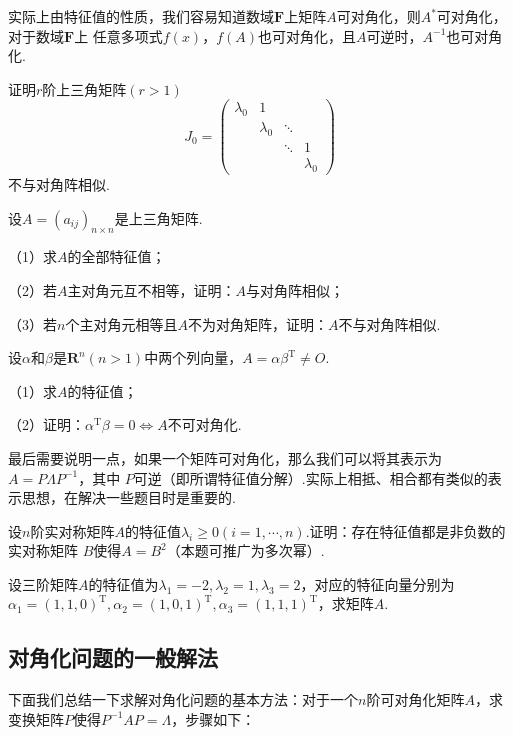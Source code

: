 实际上由特征值的性质，我们容易知道数域$\mathbf{F}$上矩阵$A$可对角化，则$A^*$可对角化，对于数域$\mathbf{F}$上
任意多项式$f(x)$，$f(A)$也可对角化，且$A$可逆时，$A^{-1}$也可对角化.
\begin{example}
	证明$r$阶上三角矩阵$(r>1)$
	$$J_0=\begin{pmatrix}
		\lambda_0 & 1 &  &  \\ 
		  & \lambda_0 & \ddots &  \\
		  &  & \ddots &  1 \\
		  &  &  &  \lambda_0
	\end{pmatrix}$$
	不与对角阵相似.
\end{example}
\begin{example}
	设$A=(a_{ij})_{n\times n}$是上三角矩阵.
	
	\textup{（1）}求$A$的全部特征值\textup{；}

	\textup{（2）}若$A$主对角元互不相等，证明：$A$与对角阵相似\textup{；}

	\textup{（3）}若$n$个主对角元相等且$A$不为对角矩阵，证明：$A$不与对角阵相似.
\end{example}
\begin{example}
	设$\alpha$和$\beta$是$\mathbf{R}^n(n>1)$中两个列向量，$A=\alpha\beta^\mathrm{T}\neq O$.
	
	\textup{（1）}求$A$的特征值\textup{；}
	
	\textup{（2）}证明：$\alpha^\mathrm{T}\beta=0\iff A$不可对角化.
\end{example}
最后需要说明一点，如果一个矩阵可对角化，那么我们可以将其表示为$A=P\Lambda P^{-1}$，其中
$P$可逆（即所谓特征值分解）.实际上相抵、相合都有类似的表示思想，在解决一些题目时是重要的.
\begin{example}
	设$n$阶实对称矩阵$A$的特征值$\lambda_i\ge 0(i=1,\cdots,n)$.证明：存在特征值都是非负数的实对称矩阵
	$B$使得$A=B^2$（本题可推广为多次幂）.
\end{example}
\begin{example}
	设三阶矩阵$A$的特征值为$\lambda_1=-2,\lambda_2=1,\lambda_3=2$，对应的特征向量分别为
	$\alpha_1=(1,1,0)^\mathrm{T},\alpha_2=(1,0,1)^\mathrm{T},\alpha_3=(1,1,1)^\mathrm{T}$，求矩阵$A$.
\end{example}
\subsection{对角化问题的一般解法}
下面我们总结一下求解对角化问题的基本方法：对于一个$n$阶可对角化矩阵$A$，求变换矩阵$P$使得$P^{-1}AP=\Lambda$，步骤如下：

